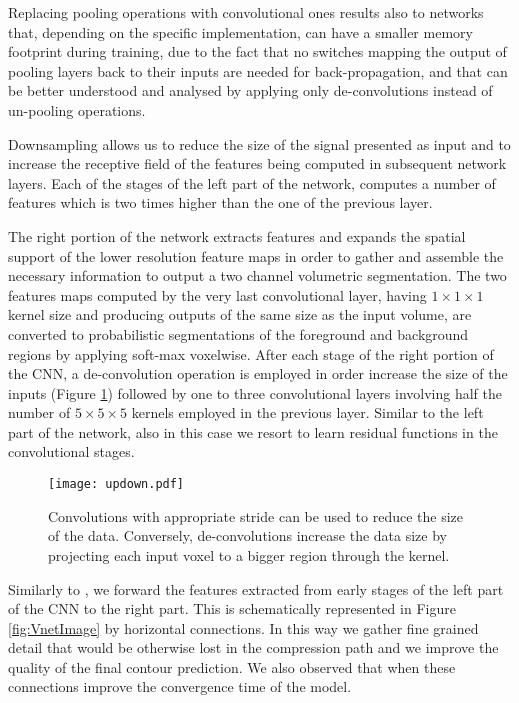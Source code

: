 \documentclass{llncs}
\begin{document}
Replacing pooling operations with convolutional ones results also to networks that, depending on the specific implementation, can have a smaller memory footprint during training, due to the fact that no switches mapping the output of pooling layers back to their inputs are needed for back-propagation, and that can be better understood and analysed \cite{zeiler2014visualizing} by applying only de-convolutions instead of un-pooling operations. 

Downsampling allows us to reduce the size of the signal presented as input and to increase the receptive field of the features being computed in subsequent network layers. Each of the stages of the left part of the network, computes a number of features which is two times higher than the one of the previous layer.

The right portion of the network extracts features and expands the spatial support of the lower resolution feature maps in order to gather and assemble the necessary information to output a two channel volumetric segmentation. The two features maps computed by the very last convolutional layer, having $1\times1\times1$ kernel size and producing outputs of the same size as the input volume, are converted to probabilistic segmentations of the foreground and background regions by applying soft-max voxelwise.
After each stage of the right portion of the CNN, a de-convolution operation is employed in order increase the size of the inputs (Figure \ref{fig:updown}) followed by one to three convolutional layers involving half the number of $5\times5\times5$ kernels employed in the previous layer. Similar to the left part of the network, also in this case we resort to learn residual functions in the convolutional stages.

\begin{figure} 	
\centering 	
\texttt{[image: updown.pdf]} 	
\caption{Convolutions with appropriate stride can be used to reduce the size of the data. Conversely, de-convolutions increase the data size by projecting each input voxel to a bigger region through the kernel.} \label{fig:updown} 
\end{figure}

Similarly to \cite{ronneberger2015u}, we forward the features extracted from early stages of the left part of the CNN to the right part. This is schematically represented in Figure \ref{fig:VnetImage} by horizontal connections. In this way we gather fine grained detail that would be otherwise lost in the compression path and we improve the quality of the final contour prediction. We also observed that when these connections improve the convergence time of the model.
\end{document}
